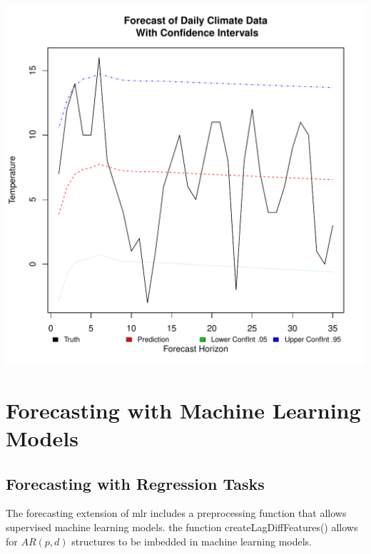 \documentclass{article}\usepackage[]{graphicx}\usepackage[]{color}
\makeatletter
\def\maxwidth{ %
  \ifdim\Gin@nat@width>\linewidth
    \linewidth
  \else
    \Gin@nat@width
  \fi
}
\newenvironment{knitrout}{}{} %
\theoremstyle{definition}
\newcommand\code{\@codex}
\def\@codex#1{{\normalfont\ttfamily\hyphenchar\font=-1 #1}}
\newcommand{\pkg}[1]{{\fontseries{b}\selectfont #1}}
\makeatother
\begin{document}
\begin{knitrout}
\color{fgcolor}
\includegraphics[width=\maxwidth]{figure/garchPlot-1} 

\end{knitrout}

\section{Forecasting with Machine Learning Models}

\subsection{Forecasting with Regression Tasks}

The forecasting extension of \pkg{mlr} includes a preprocessing function that allows supervised machine learning models. the function \code{createLagDiffFeatures()} allows for $AR(p,d)$ structures to be imbedded in machine learning models.
\end{document}
